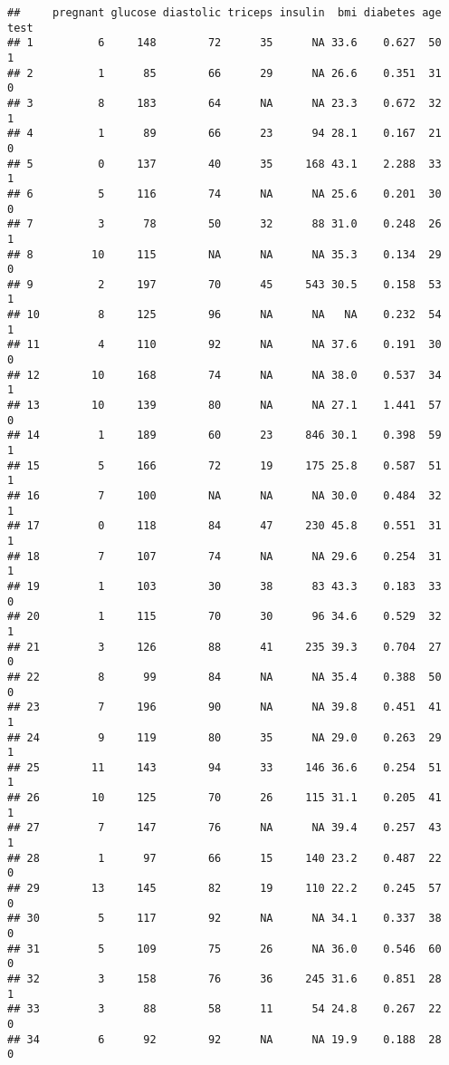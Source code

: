 \documentclass[
]{article}
\begin{document}
\begin{verbatim}
##     pregnant glucose diastolic triceps insulin  bmi diabetes age test
## 1          6     148        72      35      NA 33.6    0.627  50    1
## 2          1      85        66      29      NA 26.6    0.351  31    0
## 3          8     183        64      NA      NA 23.3    0.672  32    1
## 4          1      89        66      23      94 28.1    0.167  21    0
## 5          0     137        40      35     168 43.1    2.288  33    1
## 6          5     116        74      NA      NA 25.6    0.201  30    0
## 7          3      78        50      32      88 31.0    0.248  26    1
## 8         10     115        NA      NA      NA 35.3    0.134  29    0
## 9          2     197        70      45     543 30.5    0.158  53    1
## 10         8     125        96      NA      NA   NA    0.232  54    1
## 11         4     110        92      NA      NA 37.6    0.191  30    0
## 12        10     168        74      NA      NA 38.0    0.537  34    1
## 13        10     139        80      NA      NA 27.1    1.441  57    0
## 14         1     189        60      23     846 30.1    0.398  59    1
## 15         5     166        72      19     175 25.8    0.587  51    1
## 16         7     100        NA      NA      NA 30.0    0.484  32    1
## 17         0     118        84      47     230 45.8    0.551  31    1
## 18         7     107        74      NA      NA 29.6    0.254  31    1
## 19         1     103        30      38      83 43.3    0.183  33    0
## 20         1     115        70      30      96 34.6    0.529  32    1
## 21         3     126        88      41     235 39.3    0.704  27    0
## 22         8      99        84      NA      NA 35.4    0.388  50    0
## 23         7     196        90      NA      NA 39.8    0.451  41    1
## 24         9     119        80      35      NA 29.0    0.263  29    1
## 25        11     143        94      33     146 36.6    0.254  51    1
## 26        10     125        70      26     115 31.1    0.205  41    1
## 27         7     147        76      NA      NA 39.4    0.257  43    1
## 28         1      97        66      15     140 23.2    0.487  22    0
## 29        13     145        82      19     110 22.2    0.245  57    0
## 30         5     117        92      NA      NA 34.1    0.337  38    0
## 31         5     109        75      26      NA 36.0    0.546  60    0
## 32         3     158        76      36     245 31.6    0.851  28    1
## 33         3      88        58      11      54 24.8    0.267  22    0
## 34         6      92        92      NA      NA 19.9    0.188  28    0

\end{verbatim}
\end{document}
